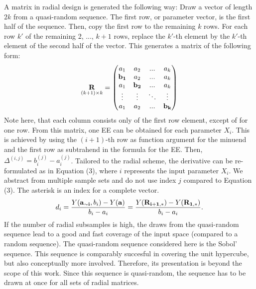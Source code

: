 \documentclass[a4paper,12pt]{article}
\begin{document}
\noindent
A matrix in radial design is generated the following way: Draw a vector of length $2k$ from a quasi-random sequence. The first row, or parameter vector, is the first half of the sequence. Then, copy the first row to the remaining $k$ rows. For each row $k'$ of the remaining 2, ..., $k+1$ rows, replace the $k'$-th element by the $k'$-th element of the second half of the vector. This generates a matrix of the following form:
\begin{align}
\underset{(k+1)\times k}{\bold{R}} =
\begin{pmatrix}
a_1 & a_2 & ... & a_k \\
\bold{b_1} & a_2 & ... & a_k \\
a_1 & \bold{b_2} & ... & a_k \\
\vdots & \vdots & 	\ddots & \vdots\\
a_1 & a_2 & ... & \bold{b_k}
\end{pmatrix}
\end{align}
\noindent
Note here, that each column consists only of the first row element, except of for one row.
From this matrix, one EE can be obtained for each parameter $X_i$. This is achieved by using the $(i+1)$-th row as function argument for the minuend and the first row as subtrahend in the formula for the EE. Then, $\Delta^{(i,j)} = b_i^{(j)} - a_i^{(j)}$. Tailored to the radial scheme, the derivative can be re-formulated as in Equation (3), where $i$ represents the input parameter $X_i$. We abstract from multiple sample sets and do not use index $j$ compared to Equation (3). The asterisk is an index for a complete vector.
\begin{align}
d_i =  \frac{Y(\bold{a_{\sim i}}, b_i) - Y(\bold{a})}{b_i - a_i} = \frac{Y(\bold{R_{i+1,*}}) -  Y(\bold{R_{1,*}})}{b_i - a_i}.
\end{align}
If the number of radial subsamples is high, the draws from the quasi-random sequence lead to a good and fast coverage of the input space (compared to a random sequence). The quasi-random sequence considered here is the Sobol' sequence. This sequence is comparably succesful in covering the unit hypercube, but also conceptually more involved. Therefore, its presentation is beyond the scope of this work. Since this sequence is quasi-random, the sequence has to be drawn at once for all sets of radial matrices.\\
\end{document}
